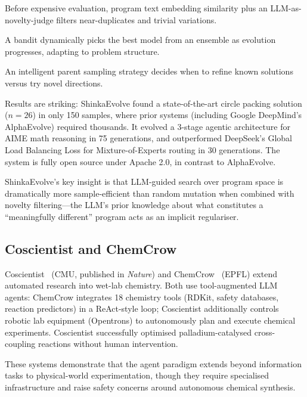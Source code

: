 \documentclass[11pt,a4paper]{article}
\begin{document}
\begin{description}[nosep, style=nextline, labelwidth=4.5cm, leftmargin=5cm]
  \item[Novelty-based rejection] Before expensive evaluation, program
    text embedding similarity plus an LLM-as-novelty-judge filters
    near-duplicates and trivial variations.
  \item[Multi-armed bandit LLM selection] A bandit dynamically picks the
    best model from an ensemble as evolution progresses, adapting to
    problem structure.
  \item[Exploration/exploitation balancing] An intelligent parent
    sampling strategy decides when to refine known solutions versus try
    novel directions.
\end{description}

\noindent
Results are striking: ShinkaEvolve found a state-of-the-art circle
packing solution ($n=26$) in only 150 samples, where prior systems
(including Google DeepMind's AlphaEvolve) required thousands. It evolved
a 3-stage agentic architecture for AIME math reasoning in 75
generations, and outperformed DeepSeek's Global Load Balancing Loss for
Mixture-of-Experts routing in 30 generations. The system is fully open
source under Apache 2.0, in contrast to AlphaEvolve.

ShinkaEvolve's key insight is that LLM-guided search over program space
is dramatically more sample-efficient than random mutation when combined
with novelty filtering---the LLM's prior knowledge about what
constitutes a ``meaningfully different'' program acts as an implicit
regulariser.

\subsection{Coscientist and ChemCrow}

Coscientist~\citep{coscientist2023} (CMU, published in \emph{Nature})
and ChemCrow~\citep{chemcrow2024} (EPFL) extend automated research into
wet-lab chemistry. Both use tool-augmented LLM agents: ChemCrow
integrates 18 chemistry tools (RDKit, safety databases, reaction
predictors) in a ReAct-style loop; Coscientist additionally controls
robotic lab equipment (Opentrons) to autonomously plan and execute
chemical experiments. Coscientist successfully optimised
palladium-catalysed cross-coupling reactions without human intervention.

These systems demonstrate that the agent paradigm extends beyond
information tasks to physical-world experimentation, though they require
specialised infrastructure and raise safety concerns around autonomous
chemical synthesis.
\end{document}

